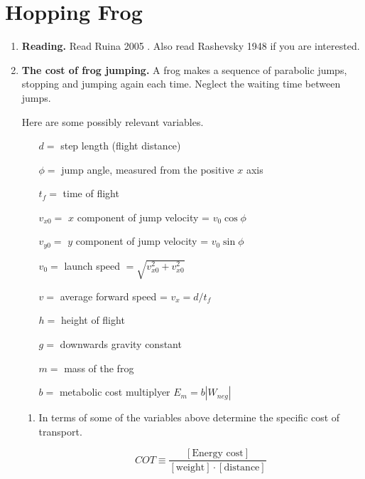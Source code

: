 \newpage
\section{Hopping Frog}

\begin{enumerate}

\item \textbf{Reading.} Read Ruina 2005 \cite{ruina05}. Also read Rashevsky 1948 \cite{rashevsky48} if you are interested.

\item \textbf{The cost of frog jumping.}  A frog makes a sequence of
parabolic jumps, stopping and jumping again each time.  Neglect the
waiting time between jumps.

Here are some possibly relevant variables.\par
\begin{center}
  \parbox{4 in}{
\begin{itemize} 
\item[$d= $] step length (flight distance) 
\item[$\phi= $] jump angle, measured from the positive $x$ axis
\item[$t_f= $] time of flight
\item[$ v_{x0}= $] $x$ component of jump velocity = $v_{0} \cos{\phi}$
\item[$ v_{y0}= $] $y$ component of jump velocity = $v_ {0} \sin{\phi}$
\item[$v_{0} = $] launch speed $=\sqrt{v_{x0}^2+v_{x0}^2}$
\item[$v= $] average forward speed = $v_x = d/t_f$
\item[$h = $] height of flight
\item[$g= $] downwards gravity constant
\item[$m= $] mass of the frog
\item[$b = $] metabolic cost multiplyer $E_{m} = b|W_{neg}|$
\end{itemize}
}
\end{center}

\begin{enumerate}
\item In terms of some of the variables above determine the specific cost of transport.

\begin{equation}                  
COT \equiv \frac{[\textrm{Energy cost}]}{[\textrm{weight}]\cdot[\textrm{distance}]}
\end{equation}


\end{enumerate}
\end{enumerate}
